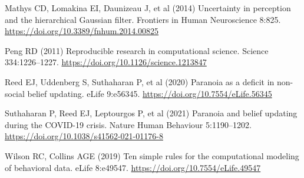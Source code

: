 \documentclass[
  11pt,
]{article}
\newlength{\cslhangindent}
\newenvironment{CSLReferences}[2] %
 {\begin{list}{}{%
  \setlength{\itemindent}{0pt}
  \setlength{\leftmargin}{0pt}
  \setlength{\parsep}{0pt}
  \ifodd #1
   \setlength{\leftmargin}{\cslhangindent}
   \setlength{\itemindent}{-1\cslhangindent}
  \fi
  \setlength{\itemsep}{#2\baselineskip}}}
 {\end{list}}
\begin{document}
\begin{CSLReferences}{1}{1}
Mathys CD, Lomakina EI, Daunizeau J, et al (2014) Uncertainty in
perception and the hierarchical {Gaussian} filter. Frontiers in Human
Neuroscience 8:825. \url{https://doi.org/10.3389/fnhum.2014.00825}

Peng RD (2011) Reproducible research in computational science. Science
334:1226--1227. \url{https://doi.org/10.1126/science.1213847}

Reed EJ, Uddenberg S, Suthaharan P, et al (2020) Paranoia as a deficit
in non-social belief updating. eLife 9:e56345.
\url{https://doi.org/10.7554/eLife.56345}

Suthaharan P, Reed EJ, Leptourgos P, et al (2021) Paranoia and belief
updating during the {COVID-19} crisis. Nature Human Behaviour
5:1190--1202. \url{https://doi.org/10.1038/s41562-021-01176-8}

Wilson RC, Collins AGE (2019) Ten simple rules for the computational
modeling of behavioral data. eLife 8:e49547.
\url{https://doi.org/10.7554/eLife.49547}

\end{CSLReferences}
\end{document}
